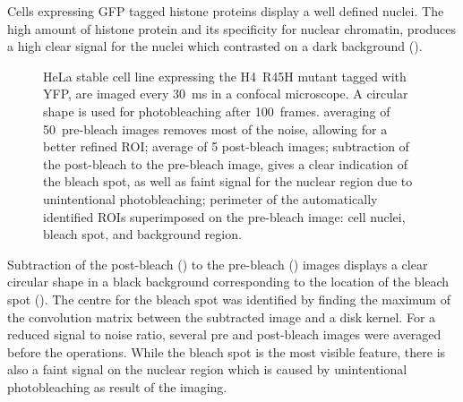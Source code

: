       Cells expressing GFP tagged histone proteins display a well defined
      nuclei. The high amount of histone protein
      and its specificity for nuclear chromatin, produces a high clear
      signal for the nuclei which contrasted on a dark background ().

      \begin{figure}
        \centering
        \hfill
        \hfill
          {
            HeLa stable cell line expressing the H4~R45H mutant tagged with YFP,
            are imaged every \SI{30}{\ms} in a confocal microscope. A circular
            shape is used for photobleaching after 100~frames.
             averaging of 50~pre-bleach
            images removes most of the noise, allowing for a better refined
            ROI;
             average of
            5 post-bleach images;
             subtraction of the
            post-bleach to the pre-bleach image, gives a clear indication
            of the bleach spot, as well as faint signal for the nuclear
            region due to unintentional photobleaching;
             perimeter of the
            automatically identified ROIs superimposed on the pre-bleach
            image: cell nuclei, bleach spot, and background region.
          }
        \label{fig:kill-frap:roi}
      \end{figure}

      Subtraction of the post-bleach () to
      the pre-bleach () images displays
      a clear circular shape in a black background corresponding to
      the location of the bleach spot ().
      The centre for the bleach spot was
      identified by finding the maximum of the convolution matrix between
      the subtracted image and a disk kernel. For a reduced signal to noise
      ratio, several pre and post-bleach images were averaged before the
      operations. While the bleach spot is
      the most visible feature, there is also a faint signal on the nuclear
      region which is caused by unintentional photobleaching as result of
      the imaging.

